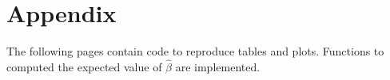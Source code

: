 \documentclass[11pt, letterpaper]{article}
\begin{document}
\section*{Appendix}

The following pages contain code to reproduce tables and plots. Functions to
computed the expected value of $\hat{\beta}$ are implemented.
\clearpage

\end{document}
